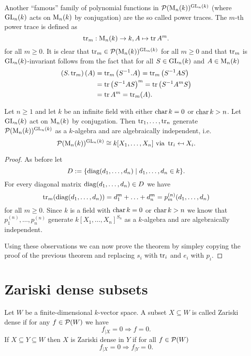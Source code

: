 Another ``famous'' family of polynomial functions in $\mathcal{P}(\operatorname{M}_n(k))^{\operatorname{GL}_n(k)}$ (where $\operatorname{GL}_n(k)$ acts on $\operatorname{M}_n(k)$ by conjugation) are the so called power traces. The $m$-th power trace is defined as
\[
 \operatorname{tr}_m : \operatorname{M}_n(k) \to k, A \mapsto \operatorname{tr} A^m.
\]
for all $m \geq 0$. It is clear that $\operatorname{tr}_m \in \mathcal{P}(\operatorname{M}_n(k))^{\operatorname{GL}_n(k)}$ for all $m \geq 0$ and that $\operatorname{tr}_m$ is $\operatorname{GL}_n(k)$-invariant follows from the fact that for all $S \in \operatorname{GL}_n(k)$ and $A \in \operatorname{M}_n(k)$
\begin{align*}
 \left(S.\operatorname{tr}_m\right)(A)
 &= \operatorname{tr}_m\left(S^{-1}.A\right)
 = \operatorname{tr}_m\left(S^{-1} A S\right) \\
 &= \operatorname{tr} \left(S^{-1} A S\right)^m
 = \operatorname{tr} \left(S^{-1} A^m S\right) \\
 &= \operatorname{tr} A^m
 = \operatorname{tr}_m(A).
\end{align*}


\begin{thrm}
 Let $n \geq 1$ and let $k$ be an infinite field with either $\operatorname{char} k = 0$ or $\operatorname{char} k > n$. Let $\operatorname{GL}_n(k)$ act on $\operatorname{M}_n(k)$ by conjugation. Then $\operatorname{tr}_1, \ldots, \operatorname{tr}_n$ generate $\mathcal{P}(\operatorname{M}_n(k))^{\operatorname{GL}_n(k)}$ as a $k$-algebra and are algebraically independent, i.e.
 \[
  \mathcal{P}(\operatorname{M}_n(k))^{\operatorname{GL}_n(k)} \cong k[X_1, \ldots, X_n] \text{ via } \operatorname{tr}_i \mapsfrom X_i.
 \]
\end{thrm}
\begin{proof}
 As before let 
 \[
  D := \{\operatorname{diag}(d_1, \ldots, d_n) \mid d_1, \ldots, d_n \in k\}.
 \]
 For every diagonal matrix $\operatorname{diag}(d_1, \ldots, d_n) \in D$ we have
 \[
  \operatorname{tr}_m(\operatorname{diag}(d_1, \ldots, d_n)) = d_1^m + \ldots + d_n^m = p^{(n)}_m(d_1, \ldots, d_n)
 \]
 for all $m \geq 0$. Since $k$ is a field with $\operatorname{char} k = 0$ or $\operatorname{char} k > n$ we know that $p^{(n)}_1, \ldots, p^{(n)}_n$ generate $k[X_1, \ldots, X_n]^{S_n}$ as a $k$-algebra and are algebraically independent.
 
 Using these observations we can now prove the theorem by simpley copying the proof of the previous theorem and replacing $s_i$ with $\operatorname{tr}_i$ and $e_i$ with $p_i$.
\end{proof}





\section{Zariski dense subsets}


\begin{defi}
 Let $W$ be a finite-dimensional $k$-vector space. A subset $X \subseteq W$ is called Zariski dense if for any $f \in \mathcal{P}(W)$ we have
 \[
  f_{|X} = 0 \Rightarrow f = 0.
 \]
 If $X \subseteq Y \subseteq W$ then $X$ is Zariski dense in $Y$ if for all $f \in \mathcal{P}(W)$
 \[
  f_{|X} = 0 \Rightarrow f_{|Y} = 0.
 \]
\end{defi}



